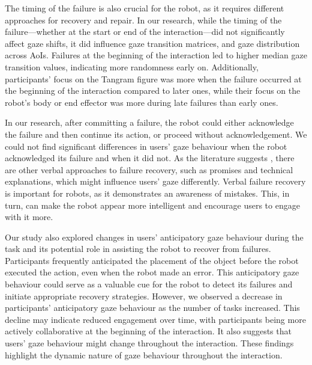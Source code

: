 The timing of the failure is also crucial for the robot, as it requires different approaches for recovery and repair. In our research, while the timing of the failure—whether at the start or end of the interaction—did not significantly affect gaze shifts, it did influence gaze transition matrices, and gaze distribution across AoIs. Failures at the beginning of the interaction led to higher median gaze transition values, indicating more randomness early on. Additionally, participants' focus on the Tangram figure was more when the failure occurred at the beginning of the interaction compared to later ones, while their focus on the robot's body or end effector was more during late failures than early ones. 



In our research, after committing a failure, the robot could either acknowledge the failure and then continue its action, or proceed without acknowledgement. We could not find significant differences in users' gaze behaviour when the robot acknowledged its failure and when it did not. As the literature suggests \cite{esterwood_you_2021, karli_what_2023, wachowiak_when_2024}, there are other verbal approaches to failure recovery, such as promises and technical explanations, which might influence users' gaze differently. Verbal failure recovery is important for robots, as it demonstrates an awareness of mistakes. This, in turn, can make the robot appear more intelligent and encourage users to engage with it more.


Our study also explored changes in users' anticipatory gaze behaviour during the task and its potential role in assisting the robot to recover from failures. Participants frequently anticipated the placement of the object before the robot executed the action, even when the robot made an error. This anticipatory gaze behaviour could serve as a valuable cue for the robot to detect its failures and initiate appropriate recovery strategies. However, we observed a decrease in participants' anticipatory gaze behaviour as the number of tasks increased. This decline may indicate reduced engagement over time, with participants being more actively collaborative at the beginning of the interaction. It also suggests that users' gaze behaviour might change throughout the interaction. These findings highlight the dynamic nature of gaze behaviour throughout the interaction.


